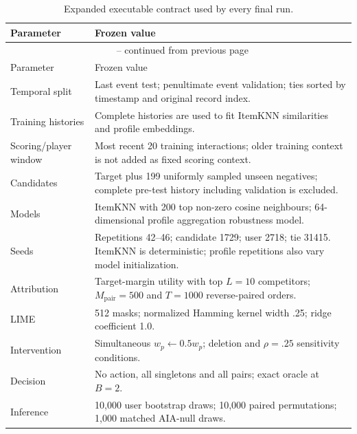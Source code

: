 \begin{longtable}{@{}p{.28\linewidth}p{.62\linewidth}@{}}
\caption{Expanded executable contract used by every final run.}\label{tab:S7}\\
\toprule
Parameter & Frozen value \\
\midrule
\endfirsthead
\multicolumn{2}{c}{\tablename\ \thetable{} -- continued from previous page}\\
\toprule
Parameter & Frozen value \\
\midrule
\endhead
\bottomrule
\endfoot
\bottomrule
\endlastfoot
Temporal split & Last event test; penultimate event validation; ties sorted by timestamp and original record index. \\
Training histories & Complete histories are used to fit ItemKNN similarities and profile embeddings. \\
Scoring/player window & Most recent 20 training interactions; older training context is not added as fixed scoring context. \\
Candidates & Target plus 199 uniformly sampled unseen negatives; complete pre-test history including validation is excluded. \\
Models & ItemKNN with 200 top non-zero cosine neighbours; 64-dimensional profile aggregation robustness model. \\
Seeds & Repetitions 42--46; candidate 1729; user 2718; tie 31415. ItemKNN is deterministic; profile repetitions also vary model initialization. \\
Attribution & Target-margin utility with top $L=10$ competitors; $M_{\mathrm{pair}}=500$ and $T=1000$ reverse-paired orders. \\
LIME & 512 masks; normalized Hamming kernel width .25; ridge coefficient 1.0. \\
Intervention & Simultaneous $w_p\leftarrow0.5w_p$; deletion and $\rho=.25$ sensitivity conditions. \\
Decision & No action, all singletons and all pairs; exact oracle at $B=2$. \\
Inference & 10,000 user bootstrap draws; 10,000 paired permutations; 1,000 matched AIA-null draws. \\
\end{longtable}
